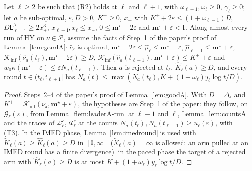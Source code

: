 \documentclass[11pt]{article}
\newcommand{\Kinf}{\mathcal K_{\inf}}
\newcommand{\cP}{\mathcal P}
\begin{document}
\begin{lemma}\label{flem:goodA-run}
Let $\ell\ge2$ be such that (R2) holds at $\ell$ and $\ell+1$, with $\omega_{\ell-1},\omega_\ell\ge0$,
$\gamma_\ell\ge0$; let $a$ be sub-optimal, $\varepsilon,D>0$, $K^+\ge0$, $x_+$ with
$K^++2\varepsilon\le(1+\omega_{\ell-1})D$, $D\mathsf L_{\ell-1}^{\beta-1}\ge2x_+^3$,
$x_{\ell-1},x_\ell\le x_+$, $0\le\mathbf m^\star-2\varepsilon$ and $\mathbf m^\star+\varepsilon<1$.
Along almost every run of HY on $\nu\in\cP$, assume the facts of Step~1 of the paper's proof of
Lemma~\ref{lem:goodA}: $\hat c_\ell$ is optimal,
$\mathbf m^\star-2\varepsilon\le\hat\mu_\ell\le\mathbf m^\star+\varepsilon$,
$\hat\mu_{\ell-1}\le\mathbf m^\star+\varepsilon$,
$\Kinf(\hat\nu_a(t_\ell),\mathbf m^\star-2\varepsilon)\ge D$,
$\Kinf(\hat\nu_a(t_{\ell-1}),\mathbf m^\star+\varepsilon)\le K^++\varepsilon$ and
$w_0\kappa(\mathbf m^\star+\varepsilon)\le\varepsilon N_a(t_{\ell-1})$. Then $a$ is rejected at
$t_\ell$, $\hat K_\ell(a)\ge D$, and every round $t\in(t_\ell,t_{\ell+1}]$ has
$N_a(t)\le\max(N_a(t_\ell),K+(1+\omega_\ell)y_\ell\log t/D)$.
\end{lemma}

\begin{proof}
Steps~2--4 of the paper's proof of Lemma~\ref{lem:goodA}. With $D=\Delta_\varepsilon$ and
$K^+=\Kinf(\nu_a,\mathbf m^\star+\varepsilon)$, the hypotheses are Step~1 of the paper: they
follow, on $\mathcal G_\ell(\varepsilon)$, from Lemma~\ref{flem:leaderA-run} at $\ell-1$ and
$\ell$, Lemma~\ref{lem:countsA} and the traces of $\mathcal L_\ell^c$, $\mathcal U_\ell^c$ at the
counts $N_a(t_\ell),N_a(t_{\ell-1})\ge u_\ell(\varepsilon)$, with (T3). In the IMED phase,
Lemma~\ref{lem:imedround} is used with $\tilde K_\ell(a)\ge\hat K_\ell(a)\ge D$ in
$[0,\infty]$ ($\tilde K_\ell(a)=\infty$ is allowed: an arm pulled at an IMED round has a finite
divergence); in the paced phase the target of a rejected arm with $\hat K_\ell(a)\ge D$ is at
most $K+(1+\omega_\ell)y_\ell\log t/D$.
\end{proof}
\end{document}
